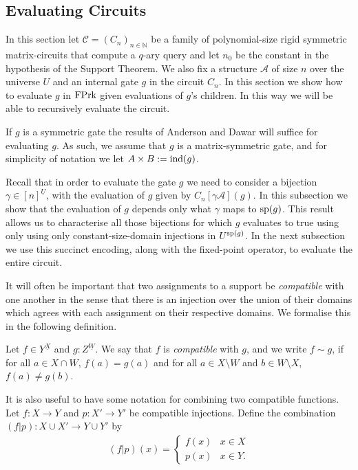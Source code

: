 \documentclass[../paper.tex]{subfiles}
\begin{document}
 \subsection {Evaluating Circuits}
 In this section let $\mathcal{C} = (C_n)_{n \in \mathbb{N}}$ be a family of
 polynomial-size rigid symmetric matrix-circuits that compute a $q$-ary query
 and let $n_0$ be the constant in the hypothesis of the Support Theorem. We also
 fix a structure $\mathcal{A}$ of size $n$ over the universe $U$ and an internal
 gate $g$ in the circuit $C_n$. In this section we show how to evaluate $g$ in
 $\text{\upshape FPrk}$ given evaluations of $g$'s children. In this way we will be able to
 recursively evaluate the circuit.

 If $g$ is a symmetric gate the results of Anderson and Dawar \cite{AndersonD17}
 will suffice for evaluating $g$. As such, we assume that $g$ is a
 matrix-symmetric gate, and for simplicity of notation we let $A \times B :=
 \text{\upshape ind}(g)$.

 Recall that in order to evaluate the gate $g$ we need to consider a bijection
 $\gamma \in [n]^{\underline{U}}$, with the evaluation of $g$ given by
 $C_n[\gamma \mathcal{A}](g)$. In this subsection we show that the evaluation of
 $g$ depends only what $\gamma$ maps to $\text{sp}(g)$. This result allows us to
 characterise all those bijections for which $g$ evaluates to true using only
 using only constant-size-domain injections in $U^{\text{sp}(g)}$. In the next
 subsection we use this succinct encoding, along with the fixed-point operator,
 to evaluate the entire circuit.
 
 It will often be important that two assignments to a support be
 \emph{compatible} with one another in the sense that there is an injection over
 the union of their domains which agrees with each assignment on their
 respective domains. We formalise this in the following definition.

\begin{definition}
  Let $f \in Y^{\underline{X}}$ and $g : Z^{\underline{W}}$. We say that $f$ is
  \emph{compatible} with $g$, and we write $f \sim g$, if for all $a \in X \cap
  W$, $f(a) = g(a)$ and for all $a \in X \setminus W$ and $b \in W \setminus X$,
  $f(a) \neq g(b)$.
\end{definition}

It is also useful to have some notation for combining two compatible functions.
Let $f : X \rightarrow Y$ and $p: X' \rightarrow Y'$ be compatible injections.
Define the combination $(f | p): X \cup X' \rightarrow Y \cup Y'$ by
\begin{align*}
  (f \vert p) (x) =
  \begin{cases}
    f (x) & x \in X \\
    p (x) & x \in Y.
  \end{cases}
\end{align*}
\end{document}
